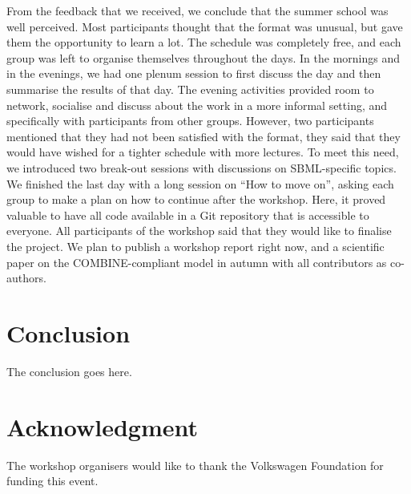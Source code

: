 \documentclass[journal,transmag]{IEEEtran}
\begin{document}
From the feedback that we received, we conclude that the summer school was well perceived. 
Most participants thought that the format was unusual, but gave them the opportunity to learn a lot. 
The schedule was completely free, and each group was left to organise themselves throughout the days. 
In the mornings and in the evenings, we had one plenum session to first discuss the day and then summarise the results of that day. 
The evening activities provided room to network, socialise and discuss about the work in a more informal setting, and specifically with participants from other groups. 
However, two participants mentioned that they had not been satisfied with the format, they said that they would have wished for a tighter schedule with more lectures. 
To meet this need, we introduced two break-out sessions with discussions on SBML-specific topics.
We finished the last day with a long session on “How to move on”, asking each group to make a plan on how to continue after the workshop. 
Here, it proved valuable to have all code available in a Git repository that is accessible to everyone. 
All participants of the workshop said that they would like to finalise the project. 
We plan to publish a workshop report right now, and a scientific paper on the COMBINE-compliant model in autumn with all contributors as co-authors.


\section{Conclusion}
The conclusion goes here.

\section*{Acknowledgment}

The workshop organisers would like to thank the Volkswagen Foundation for funding this event. 

\ifCLASSOPTIONcaptionsoff
  \newpage
\fi





% 
\end{document}
